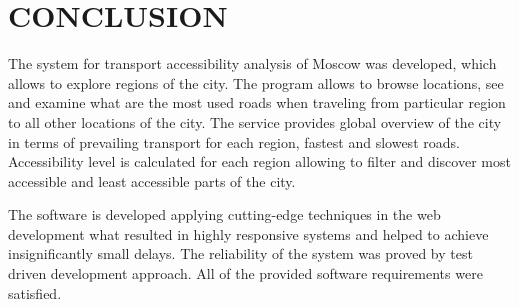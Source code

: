 \section{CONCLUSION}

The system for transport accessibility analysis of Moscow was developed, which allows to explore
regions of the city. The program allows to browse locations, see and examine what are the most
used roads when traveling from particular region to all other locations of the city. The service
provides global overview of the city in terms of prevailing transport for each region, fastest
and slowest roads. Accessibility level is calculated for each region allowing to filter and
discover most accessible and least accessible parts of the city.

The software is developed applying cutting-edge techniques in the web development what resulted in
highly responsive systems and helped to achieve insignificantly small delays. The reliability of the
system was proved by test driven development approach. All of the provided software requirements
were satisfied.
